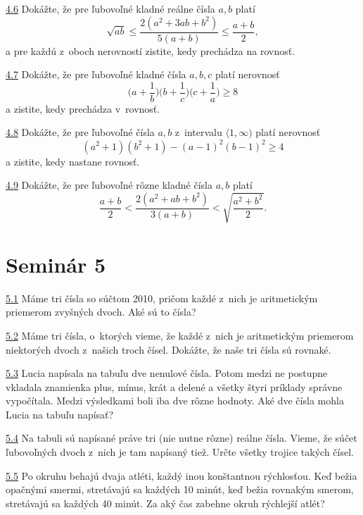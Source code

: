 \noindent \ul{4.6}  Dokážte, že pre ľubovoľné kladné reálne čísla $a, b$ platí
$$ \sqrt{ab}\leq \frac{2(a^2+3ab+b^2)}{5(a+b)}\leq \frac{a+b}{2},$$
a pre každú z~oboch nerovností zistite, kedy prechádza na rovnosť.




\noindent \ul{4.7} 
Dokážte, že pre ľubovoľné kladné čísla $a, b, c$ platí nerovnosť
$$\bigg(a +\frac{1}{b}\bigg)\bigg(b+\frac{1}{c}\bigg)\bigg(c+\frac{1}{a}\bigg)\geq 8$$
a zistite, kedy prechádza v~rovnosť.




\noindent \ul{4.8} 
Dokážte, že pre ľubovoľné čísla $a, b$ z~intervalu $\langle 1, \infty)$ platí nerovnosť
$$ (a^2 + 1)(b^2 + 1) - (a - 1)^2 (b - 1)^2 \geq 4$$
a zistite, kedy nastane rovnosť.




\noindent \ul{4.9} 
Dokážte, že pre ľubovoľné rôzne kladné čísla $a, b$ platí
$$\frac{a+b}{2}<\frac{2(a^2 + ab + b^2 )}{3(a+b)}<\sqrt{\frac{a^2+b^2}{2}}.$$




\section*{Seminár 5}

\noindent \ul{5.1}  Máme tri čísla so súčtom 2010, pričom každé z~nich je aritmetickým priemerom zvyšných dvoch. Aké sú to čísla?




\noindent \ul{5.2}  Máme tri čísla, o~ktorých vieme, že každé z~nich je aritmetickým priemerom niektorých dvoch z~našich troch čísel. Dokážte, že naše tri čísla sú rovnaké.




\noindent \ul{5.3} 
Lucia napísala na tabuľu dve nenulové čísla. Potom medzi ne postupne vkladala znamienka plus, mínus, krát a delené a všetky štyri príklady správne vypočítala. Medzi výsledkami boli iba dve rôzne hodnoty. Aké dve čísla mohla Lucia na tabuľu napísať?




\noindent \ul{5.4} 
Na tabuli sú napísané práve tri (nie nutne rôzne) reálne čísla. Vieme, že súčet ľubovoľných dvoch z~nich je tam napísaný tiež. Určte všetky trojice takých čísel.




\noindent \ul{5.5} 
Po okruhu behajú dvaja atléti, každý inou konštantnou rýchlosťou. Keď bežia opačnými smermi, stretávajú sa každých 10 minút, keď bežia rovnakým smerom, stretávajú sa každých 40 minút. Za aký čas zabehne okruh rýchlejší atlét?




